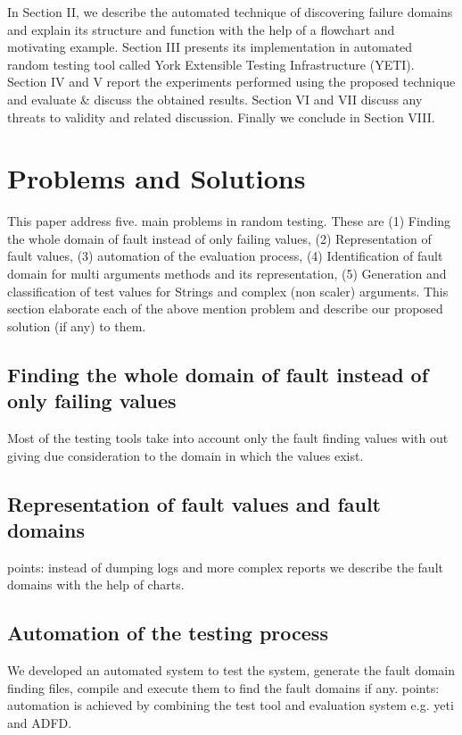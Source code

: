 \documentclass{acm_proc_article-sp}
\begin{document}
In Section II, we describe the automated technique of  discovering failure domains and explain its structure and function with the help of a flowchart and motivating example. Section III presents its implementation in automated random testing tool called York Extensible Testing Infrastructure (YETI). Section IV and V report the experiments performed using the proposed technique and evaluate \& discuss the obtained results. Section VI and VII discuss any threats to validity and related discussion. Finally we conclude in Section VIII. 


\section{Problems and Solutions}
This paper address five. main problems in random testing. These are (1) Finding the whole domain of fault instead of only failing values, (2) Representation of fault values, (3) automation of the evaluation process, (4) Identification of fault domain for multi arguments methods and its representation, (5) Generation and classification of test values for Strings and complex (non scaler) arguments. This section elaborate each of the above mention problem and describe our proposed solution (if any) to them.

\subsection{Finding the whole domain of fault instead of only failing values}
Most of the testing tools take into account only the fault finding values with out giving due consideration to the domain in which the values exist. \subsection{Representation of fault values and fault domains}
points: instead of dumping logs and more complex reports we describe the fault domains with the help of charts. 
\subsection{Automation of the testing process}
We developed an automated system to test the system, generate the fault domain finding files, compile and execute them to find the fault domains if any. points: automation is achieved by combining the test tool and evaluation system e.g. yeti and ADFD.   
\end{document}
